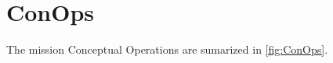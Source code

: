 \section{ConOps}
\label{sec:conops}

The mission Conceptual Operations are sumarized in \autoref{fig:ConOps}.

